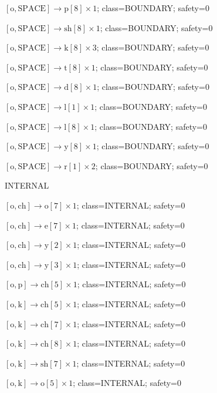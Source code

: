 \(\left[\mathrm{o}, \mathrm{SPACE}\right] \to \mathrm{p}[8] \times 1\); class=BOUNDARY; safety=0\par
\(\left[\mathrm{o}, \mathrm{SPACE}\right] \to \mathrm{sh}[8] \times 1\); class=BOUNDARY; safety=0\par
\(\left[\mathrm{o}, \mathrm{SPACE}\right] \to \mathrm{k}[8] \times 3\); class=BOUNDARY; safety=0\par
\(\left[\mathrm{o}, \mathrm{SPACE}\right] \to \mathrm{t}[8] \times 1\); class=BOUNDARY; safety=0\par
\(\left[\mathrm{o}, \mathrm{SPACE}\right] \to \mathrm{d}[8] \times 1\); class=BOUNDARY; safety=0\par
\(\left[\mathrm{o}, \mathrm{SPACE}\right] \to \mathrm{l}[1] \times 1\); class=BOUNDARY; safety=0\par
\(\left[\mathrm{o}, \mathrm{SPACE}\right] \to \mathrm{l}[8] \times 1\); class=BOUNDARY; safety=0\par
\(\left[\mathrm{o}, \mathrm{SPACE}\right] \to \mathrm{y}[8] \times 1\); class=BOUNDARY; safety=0\par
\(\left[\mathrm{o}, \mathrm{SPACE}\right] \to \mathrm{r}[1] \times 2\); class=BOUNDARY; safety=0\par
INTERNAL\par
\(\left[\mathrm{o}, \mathrm{ch}\right] \to \mathrm{o}[7] \times 1\); class=INTERNAL; safety=0\par
\(\left[\mathrm{o}, \mathrm{ch}\right] \to \mathrm{e}[7] \times 1\); class=INTERNAL; safety=0\par
\(\left[\mathrm{o}, \mathrm{ch}\right] \to \mathrm{y}[2] \times 1\); class=INTERNAL; safety=0\par
\(\left[\mathrm{o}, \mathrm{ch}\right] \to \mathrm{y}[3] \times 1\); class=INTERNAL; safety=0\par
\(\left[\mathrm{o}, \mathrm{p}\right] \to \mathrm{ch}[5] \times 1\); class=INTERNAL; safety=0\par
\(\left[\mathrm{o}, \mathrm{k}\right] \to \mathrm{ch}[5] \times 1\); class=INTERNAL; safety=0\par
\(\left[\mathrm{o}, \mathrm{k}\right] \to \mathrm{ch}[7] \times 1\); class=INTERNAL; safety=0\par
\(\left[\mathrm{o}, \mathrm{k}\right] \to \mathrm{ch}[8] \times 1\); class=INTERNAL; safety=0\par
\(\left[\mathrm{o}, \mathrm{k}\right] \to \mathrm{sh}[7] \times 1\); class=INTERNAL; safety=0\par
\(\left[\mathrm{o}, \mathrm{k}\right] \to \mathrm{o}[5] \times 1\); class=INTERNAL; safety=0\par
